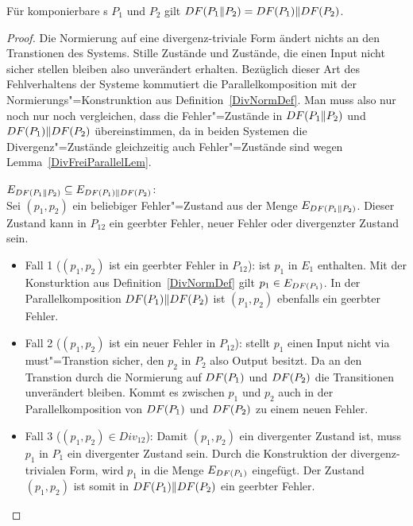\begin{Lem}
  \label{ParallDivNormKommLem}
  Für komponierbare \MEIO{}s $P_1$ und $P_2$ gilt $DF (P_1\|P_2) = DF (P_1)\|
  DF (P_2)$.
\end{Lem}
\begin{proof}
  Die Normierung auf eine divergenz-triviale Form ändert nichts an den
  Transtionen des Systems. Stille Zustände und Zustände, die einen Input nicht
  sicher stellen bleiben also unverändert erhalten. Bezüglich dieser Art des
  Fehlverhaltens der Systeme kommutiert die Parallelkomposition mit der
  Normierungs"=Konstrunktion aus Definition~\ref{DivNormDef}. Man muss also nur
  noch nur noch vergleichen, dass die Fehler"=Zustände in $DF (P_1\|P_2)$ und
  $DF (P_1)\| DF (P_2)$ übereinstimmen, da in beiden Systemen die
  Divergenz"=Zustände gleichzeitig auch Fehler"=Zustände sind wegen
  Lemma~\ref{DivFreiParallelLem}.

  $E_{DF (P_1\|P_2)} \subseteq E_{DF (P_1)\| DF (P_2)}$:\\
  Sei $(p_1,p_2)$ ein beliebiger Fehler"=Zustand aus der Menge $E_{DF
  (P_1\|P_2)}$. Dieser Zustand kann in $P_{12}$ ein geerbter Fehler, neuer
  Fehler oder divergenzter Zustand sein.
  \begin{itemize}
    \item Fall 1 ($(p_1,p_2)$ ist ein geerbter Fehler in $P_{12}$): \OBdA{} ist
      $p_1$ in $E_1$ enthalten. Mit der Konsturktion aus
      Definition~\ref{DivNormDef} gilt $p_1\in E_{DF (P_1)}$. In der
      Parallelkomposition $DF (P_1)\|DF (P_2)$ ist $(p_1,p_2)$ ebenfalls ein
      geerbter Fehler.
    \item Fall 2 ($(p_1,p_2)$ ist ein neuer Fehler in $P_{12}$): \OBdA{} stellt
      $p_1$ einen Input nicht via must"=Transtion sicher, den $p_2$ in $P_2$
      also Output besitzt. Da an den Transtion durch die Normierung auf $DF
      (P_1)$ und $DF (P_2)$ die Transitionen unverändert bleiben. Kommt es
      zwischen $p_1$ und $p_2$ auch in der Parallelkomposition von $DF (P_1)$
      und $DF (P_2)$ zu einem neuen Fehler.
    \item Fall 3 ($(p_1,p_2)\in Div_{12}$): Damit $(p_1,p_2)$ ein divergenter
      Zustand ist, muss \oBdA{} $p_1$ in $P_1$ ein divergenter Zustand sein.
      Durch die Konstruktion der divergenz-trivialen Form, wird $p_1$ in die
      Menge $E_{DF (P_1)}$ eingefügt. Der Zustand $(p_1,p_2)$ ist somit in
      $DF (P_1)\|DF (P_2)$ ein geerbter Fehler.
  \end{itemize}


\end{proof}

